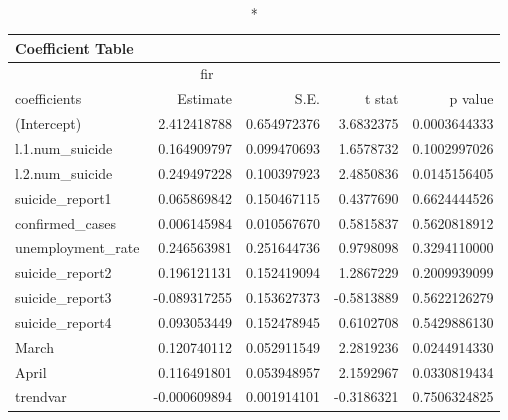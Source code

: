 \begin{longtable}{lrrrr}
\caption*{
{\large Coefficient Table}
} \\ 
\toprule
\multicolumn{4}{c}{fir} &  \\ 
\cmidrule(lr){1-4}
coefficients & Estimate & S.E. & t stat & p value \\ 
\midrule
(Intercept) & 2.412418788 & 0.654972376 & 3.6832375 & 0.0003644333 \\ 
l.1.num\_suicide & 0.164909797 & 0.099470693 & 1.6578732 & 0.1002997026 \\ 
l.2.num\_suicide & 0.249497228 & 0.100397923 & 2.4850836 & 0.0145156405 \\ 
suicide\_report1 & 0.065869842 & 0.150467115 & 0.4377690 & 0.6624444526 \\ 
confirmed\_cases & 0.006145984 & 0.010567670 & 0.5815837 & 0.5620818912 \\ 
unemployment\_rate & 0.246563981 & 0.251644736 & 0.9798098 & 0.3294110000 \\ 
suicide\_report2 & 0.196121131 & 0.152419094 & 1.2867229 & 0.2009939099 \\ 
suicide\_report3 & -0.089317255 & 0.153627373 & -0.5813889 & 0.5622126279 \\ 
suicide\_report4 & 0.093053449 & 0.152478945 & 0.6102708 & 0.5429886130 \\ 
March & 0.120740112 & 0.052911549 & 2.2819236 & 0.0244914330 \\ 
April & 0.116491801 & 0.053948957 & 2.1592967 & 0.0330819434 \\ 
trendvar & -0.000609894 & 0.001914101 & -0.3186321 & 0.7506324825 \\ 
\bottomrule
\end{longtable}

